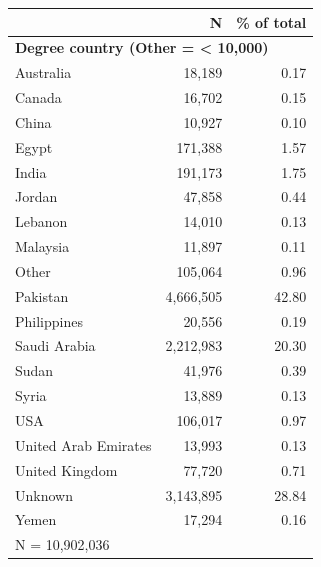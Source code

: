\begin{tabular}{lrr}


\toprule


 & N & \% of total \\


\midrule


\multicolumn{3}{l}{\textbf{Degree country (Other = < 10{,}000)}}\\ 
\midrule
Australia           &      18,189&        0.17\\
Canada              &      16,702&        0.15\\
China               &      10,927&        0.10\\
Egypt               &     171,388&        1.57\\
India               &     191,173&        1.75\\
Jordan              &      47,858&        0.44\\
Lebanon             &      14,010&        0.13\\
Malaysia            &      11,897&        0.11\\
Other               &     105,064&        0.96\\
Pakistan            &   4,666,505&       42.80\\
Philippines         &      20,556&        0.19\\
Saudi Arabia        &   2,212,983&       20.30\\
Sudan               &      41,976&        0.39\\
Syria               &      13,889&        0.13\\
USA                 &     106,017&        0.97\\
United Arab Emirates&      13,993&        0.13\\
United Kingdom      &      77,720&        0.71\\
Unknown             &   3,143,895&       28.84\\
Yemen               &      17,294&        0.16\\
\midrule


\multicolumn{3}{l}{\footnotesize N =   10,902,036}\\


\bottomrule


\end{tabular}



